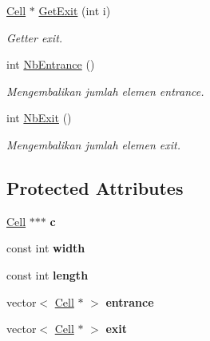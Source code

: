 \begin{DoxyCompactItemize}
\hyperlink{classCell}{Cell} $\ast$ \hyperlink{classZoo_a23c21d0e78ece74d7e0be4b67351911e}{Get\+Exit} (int i)
\begin{DoxyCompactList}\small\item\em Getter exit. \end{DoxyCompactList}\item 
int \hyperlink{classZoo_a3325c4efe9874ddaf581acafd3ae836f}{Nb\+Entrance} ()
\begin{DoxyCompactList}\small\item\em Mengembalikan jumlah elemen entrance. \end{DoxyCompactList}\item 
int \hyperlink{classZoo_abb09d111979b600efc38dc2a3ef80e7e}{Nb\+Exit} ()
\begin{DoxyCompactList}\small\item\em Mengembalikan jumlah elemen exit. \end{DoxyCompactList}\end{DoxyCompactItemize}
\subsection*{Protected Attributes}
\begin{DoxyCompactItemize}
\item 
\hyperlink{classCell}{Cell} $\ast$$\ast$$\ast$ {\bfseries c}\hypertarget{classZoo_abcf75b91e11ed5fa07becc16ece28363}{}\label{classZoo_abcf75b91e11ed5fa07becc16ece28363}

\item 
const int {\bfseries width}\hypertarget{classZoo_a10ffe4a01dcf1499bb6ab7afc98a6b64}{}\label{classZoo_a10ffe4a01dcf1499bb6ab7afc98a6b64}

\item 
const int {\bfseries length}\hypertarget{classZoo_a4a600de4e015dfbb42bacf0c71acd4ba}{}\label{classZoo_a4a600de4e015dfbb42bacf0c71acd4ba}

\item 
vector$<$ \hyperlink{classCell}{Cell} $\ast$ $>$ {\bfseries entrance}\hypertarget{classZoo_a05678fc87bb83e4f6725dfd0b00d1768}{}\label{classZoo_a05678fc87bb83e4f6725dfd0b00d1768}

\item 
vector$<$ \hyperlink{classCell}{Cell} $\ast$ $>$ {\bfseries exit}\hypertarget{classZoo_aa391a0c8116c36ddbdfbf478f3f378ff}{}\label{classZoo_aa391a0c8116c36ddbdfbf478f3f378ff}

\end{DoxyCompactItemize}


